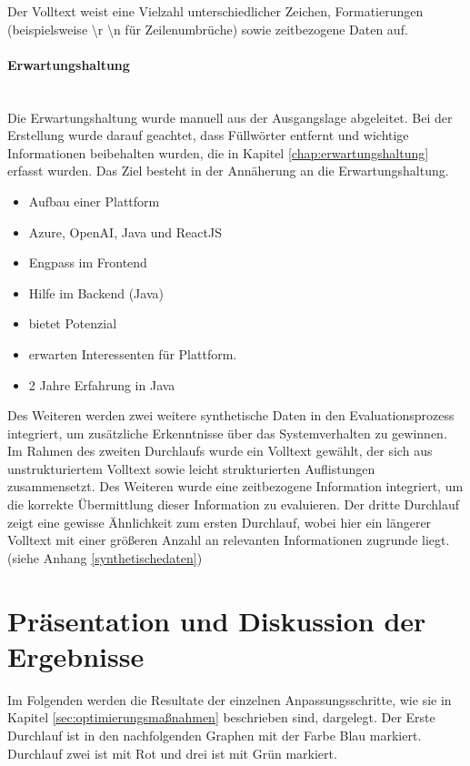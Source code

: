 Der Volltext weist eine Vielzahl unterschiedlicher Zeichen, Formatierungen (beispielsweise \textbackslash r \textbackslash n für Zeilenumbrüche) sowie zeitbezogene Daten auf.
\paragraph{Erwartungshaltung}\mbox{}\\
Die Erwartungshaltung wurde manuell aus der Ausgangslage abgeleitet. Bei der Erstellung wurde darauf geachtet, dass Füllwörter entfernt und wichtige Informationen beibehalten wurden, die in Kapitel \ref{chap:erwartungshaltung} erfasst wurden. Das Ziel besteht in der Annäherung an die Erwartungshaltung.
\begin{itemize}
	\itemsep-0.5em
	\item Aufbau einer Plattform
	\item Azure, OpenAI, Java und ReactJS
	\item Engpass im Frontend
	\item Hilfe im Backend (Java)
	\item bietet Potenzial
	\item erwarten Interessenten für Plattform.
	\item 2 Jahre Erfahrung in Java
\end{itemize}
Des Weiteren werden zwei weitere synthetische Daten in den Evaluationsprozess integriert, um zusätzliche Erkenntnisse über das Systemverhalten zu gewinnen. Im Rahmen des zweiten Durchlaufs wurde ein Volltext gewählt, der sich aus unstrukturiertem Volltext sowie leicht strukturierten Auflistungen zusammensetzt. Des Weiteren wurde eine zeitbezogene Information integriert, um die korrekte Übermittlung dieser Information zu evaluieren. Der dritte Durchlauf zeigt eine gewisse Ähnlichkeit zum ersten Durchlauf, wobei hier ein längerer Volltext mit einer größeren Anzahl an relevanten Informationen zugrunde liegt. (siehe Anhang \ref{synthetischedaten})
\section{Präsentation und Diskussion der Ergebnisse}
Im Folgenden werden die Resultate der einzelnen Anpassungsschritte, wie sie in Kapitel \ref{sec:optimierungsmaßnahmen} beschrieben sind, dargelegt. Der Erste Durchlauf ist in den nachfolgenden Graphen mit der Farbe Blau markiert. Durchlauf zwei ist mit Rot und drei ist mit Grün markiert.
